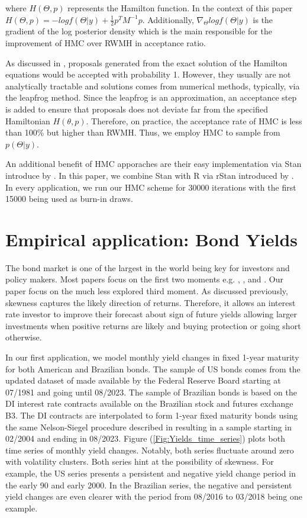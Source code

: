 \documentclass{article}
\begin{document}
where $H(\Theta, p)$ represents the Hamilton function. In the context of this paper $H(\Theta, p) = -log f(\Theta|y) + \frac{1}{2} p^{T} M^{-1} p$. Additionally, $\nabla_{\Theta} log f(\Theta|y)$ is the gradient of the log posterior density which is the main responsible for the improvement of HMC over RWMH in acceptance ratio.  
 
As discussed in \cite{betancourt2017conceptual}, proposals generated from the exact solution of the Hamilton equations would be accepted with probability 1. However, they usually are not analytically tractable and solutions comes from numerical methods, typically, via the leapfrog method. Since the leapfrog is an approximation, an acceptance step is added to ensure that proposals does not deviate far from the specified Hamiltonian $H(\theta, p)$. Therefore, on practice, the acceptance rate of HMC is less than 100\% but higher than RWMH. Thus, we employ HMC to sample from $p(\Theta|y)$. 

An additional benefit of HMC apporaches are their easy implementation via Stan introduce by \cite{carpenter2017stan}. In this paper, we combine Stan with R via rStan introduced by \cite{guo2020package}. In every application, we run our HMC scheme for 30000 iterations with the first 15000 being used as burn-in draws.

\section{Empirical application: Bond Yields}\label{Sec:BondYields}

The bond market is one of the largest in the world being key for investors and policy makers. Most papers focus on the first two moments e.g. \cite{litterman1991common}, \cite{collin2002bonds}, \cite{cochrane2005bond} and \cite{joslin2018can}. Our paper focus on the much less explored third moment. As discussed previously,  skewness captures the likely direction of returns. Therefore, it allows an interest rate investor to improve their forecast about sign of future yields allowing larger investments when positive returns are likely and buying protection or going short otherwise. 

In our first application, we model monthly yield changes in fixed 1-year maturity for both American and Brazilian bonds. The sample of US bonds comes from the updated dataset of \cite{gurkaynak2007us} made available by the Federal Reserve Board starting at 07/1981 and going until 08/2023. The sample of Brazilian bonds is based on the DI interest rate contracts available on the Brazilian stock and futures exchange B3. The DI contracts are interpolated to form 1-year fixed maturity bonds using the same Nelson-Siegel procedure described in \cite{gurkaynak2007us} resulting in a sample starting in 02/2004 and ending in 08/2023. Figure (\ref{Fig:Yields_time_series}) plots both time series of monthly yield changes. Notably, both series fluctuate around zero with volatility clusters. Both series hint at the possibility of skewness. For example, the US series presents a persistent and negative yield change period in the early 90 and early 2000. In the Brazilian series, the negative and persistent yield changes are even clearer with the period from 08/2016 to 03/2018 being one example.  
\end{document}

